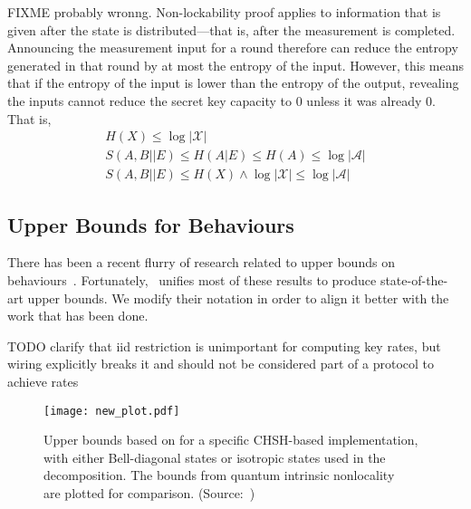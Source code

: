 \documentclass[10pt, a4paper]{article}
\numberwithin{equation}{section} %
\theoremstyle{definition}
\theoremstyle{plain}
\newcommand{\abs}[1]{\left\lvert#1\right\rvert}
\newcommand{\?}{\mathrel{?}} %
\newcommand{\sA}{\mathcal{A}}
\newcommand{\sX}{\mathcal{X}}
\begin{document}
        FIXME probably wronng. Non-lockability proof applies to information that is given after the state is distributed---that is, after the measurement is completed. Announcing the measurement input for a round therefore can reduce the entropy generated in that round by at most the entropy of the input. However, this means that if the entropy of the input is lower than the entropy of the output, revealing the inputs cannot reduce the secret key capacity to 0 unless it was already 0. That is,
      \begin{gather}
        H(X) \leq \log\abs{\sX} \\
        S(A,B||E) \leq H(A|E) \leq H(A) \leq \log\abs{\sA} \\
        S(A,B||E) \leq H(X) \land \log\abs{\sX} \leq \log\abs{\sA} 
      \end{gather}

      \subsection{Upper Bounds for Behaviours}

      There has been a recent flurry of research related to upper bounds on behaviours~\cite{NotSufficient, RevisedPeres, DIQKD_QKD_Gap, CCSquashedEntangle, DIQKD_Limits}. Fortunately,~\cite{CCSquashedEntangle} unifies most of these results to produce state-of-the-art upper bounds. We modify their notation in order to align it better with the work that has been done.

      TODO clarify that iid restriction is unimportant for computing key rates, but wiring explicitly breaks it and should not be considered part of a protocol to achieve rates

      \begin{figure}
        \centering
        \texttt{[image: new\_plot.pdf]}
        \caption[Comparison of upper bounds.]{\label{fig:genubound} Upper bounds based on  for a specific CHSH-based implementation, with either Bell-diagonal states or isotropic states used in the decomposition. The bounds from quantum intrinsic nonlocality~\cite{DIQKD_Limits}~\cite[Appendix B]{RevisedPeres} are plotted for comparison. (Source:~\cite{CCSquashedEntangle})}
      \end{figure}
\end{document}
